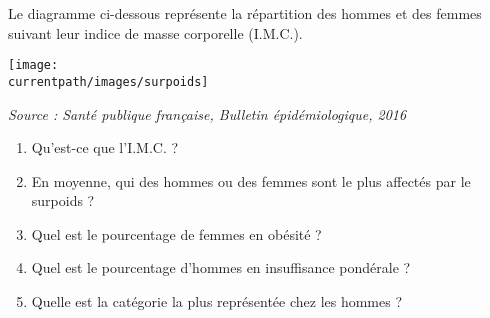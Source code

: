 
\begin{exercice*}
   Le diagramme ci-dessous représente la répartition des hommes et des femmes suivant leur indice de masse corporelle (I.M.C.).
   \begin{center}
      \texttt{[image: \\currentpath/images/surpoids]}

      \hfill {\scriptsize\it Source : Santé publique française, Bulletin épidémiologique, 2016}
   \end{center}
   \begin{enumerate}
      \item Qu'est-ce que l'I.M.C. ?
      \item En moyenne, qui des hommes ou des femmes sont le plus affectés par le surpoids ?
      \item Quel est le pourcentage de femmes en obésité ?
      \item Quel est le pourcentage d'hommes en insuffisance pondérale ?
      \item Quelle est la catégorie la plus représentée chez les hommes ?
   \end{enumerate}
\end{exercice*}
